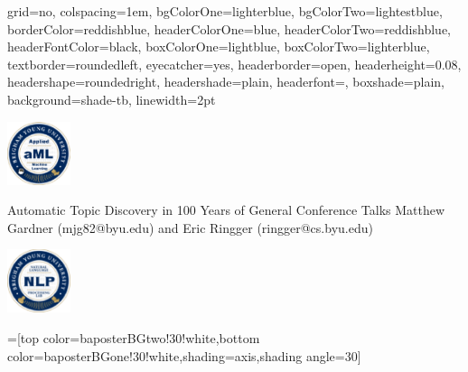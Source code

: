 \documentclass[landscape,final]{baposter}
\begin{document}

\begin{poster}{
  grid=no,
  colspacing=1em,
  bgColorOne=lighterblue,
  bgColorTwo=lightestblue,
  borderColor=reddishblue,
  headerColorOne=blue,
  headerColorTwo=reddishblue,
  headerFontColor=black,
  boxColorOne=lightblue,
  boxColorTwo=lighterblue,
  textborder=roundedleft,
  eyecatcher=yes,
  headerborder=open,
  headerheight=0.08\textheight,
  headershape=roundedright,
  headershade=plain,
  headerfont=\Large\textsf, %
  boxshade=plain,
  background=shade-tb,
  linewidth=2pt
  }
  {{\begin{minipage}{7em}
    \includegraphics[height=5em]{amllogo}
  \end{minipage}}
  }
  {\sf %
  Automatic Topic Discovery in 100 Years of General Conference Talks}
  {\sf %
  Matthew Gardner
  (mjg82@byu.edu)
  and
  Eric Ringger
  (ringger@cs.byu.edu)
  }
  {{\begin{minipage}{7em}
    \hfill
    \includegraphics[height=5em]{byunlp}
  \end{minipage}}
  }

  =[top color=baposterBGtwo!30!white,bottom color=baposterBGone!30!white,shading=axis,shading angle=30]


\end{poster}
\end{document}
